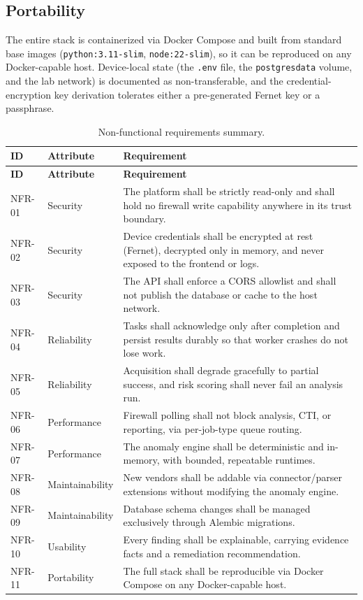 \documentclass[12pt,a4paper]{report}
\renewcommand{\_}{\textunderscore\allowbreak}
\newcommand{\hrow}{}
\newcommand{\hcell}[1]{\textbf{#1}}
\newcommand{\altrow}{}
\begin{document}
\subsection{Portability}
\label{sec:ch3-nfr-portability}
The entire stack is containerized via Docker Compose and built from standard base images (\texttt{python:3.11-slim}, \texttt{node:22-slim}), so it can be reproduced on any Docker-capable host. Device-local state (the \texttt{.env} file, the \texttt{postgres\_data} volume, and the lab network) is documented as non-transferable, and the credential-encryption key derivation tolerates either a pre-generated Fernet key or a passphrase.

\begin{longtable}{C{1.1cm} L{3.0cm} L{10.1cm}}
\caption{Non-functional requirements summary.}\label{tab:ch3-nfr}\\
\hline
\hcell{ID} & \hcell{Attribute} & \hcell{Requirement} \\
\hline
\endfirsthead
\hline
\hcell{ID} & \hcell{Attribute} & \hcell{Requirement} \\
\hline
\endhead
\hline
\endfoot
\hline
\endlastfoot
\hrow NFR-01 & Security & The platform shall be strictly read-only and shall hold no firewall write capability anywhere in its trust boundary. \\
\altrow NFR-02 & Security & Device credentials shall be encrypted at rest (Fernet), decrypted only in memory, and never exposed to the frontend or logs. \\
\hrow NFR-03 & Security & The API shall enforce a CORS allowlist and shall not publish the database or cache to the host network. \\
\altrow NFR-04 & Reliability & Tasks shall acknowledge only after completion and persist results durably so that worker crashes do not lose work. \\
\hrow NFR-05 & Reliability & Acquisition shall degrade gracefully to partial success, and risk scoring shall never fail an analysis run. \\
\altrow NFR-06 & Performance & Firewall polling shall not block analysis, CTI, or reporting, via per-job-type queue routing. \\
\hrow NFR-07 & Performance & The anomaly engine shall be deterministic and in-memory, with bounded, repeatable runtimes. \\
\altrow NFR-08 & Maintainability & New vendors shall be addable via connector/parser extensions without modifying the anomaly engine. \\
\hrow NFR-09 & Maintainability & Database schema changes shall be managed exclusively through Alembic migrations. \\
\altrow NFR-10 & Usability & Every finding shall be explainable, carrying evidence facts and a remediation recommendation. \\
\hrow NFR-11 & Portability & The full stack shall be reproducible via Docker Compose on any Docker-capable host. \\
\end{longtable}
\end{document}
